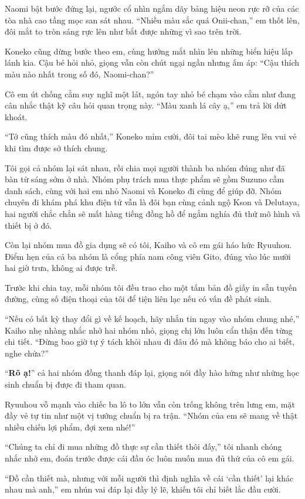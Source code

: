 ﻿\documentclass[../main.tex]{subfiles}
\begin{document}
Naomi bật bước đứng lại, ngước cổ nhìn ngắm dãy bảng hiệu neon rực rỡ của các tòa nhà cao tầng mọc san sát nhau. ``Nhiều màu sắc quá Onii-chan,'' em thốt lên, đôi mắt to tròn sáng rực lên như bắt được những vì sao trên trời.

Koneko cũng dừng bước theo em, cùng hướng mắt nhìn lên những biển hiệu lấp lánh kia. Cậu bé hỏi nhỏ, giọng vẫn còn chút ngại ngần nhưng ấm áp: ``Cậu thích màu nào nhất trong số đó, Naomi-chan?''

Cô em út chống cằm suy nghĩ một lát, ngón tay nhỏ bé chạm vào cằm như đang cân nhắc thật kỹ câu hỏi quan trọng này. ``Màu xanh lá cây ạ,'' em trả lời dứt khoát.

``Tớ cũng thích màu đó nhất,'' Koneko mỉm cười, đôi tai mèo khẽ rung lên vui vẻ khi tìm được sở thích chung.

Tôi gọi cả nhóm lại sát nhau, rồi chia mọi người thành ba nhóm đúng như đã bàn từ sáng sớm ở nhà. Nhóm phụ trách mua thực phẩm sẽ gồm Suzuno cầm danh sách, cùng với hai em nhỏ Naomi và Koneko đi cùng để giúp đỡ. Nhóm chuyên đi khám phá khu điện tử vẫn là đôi bạn cùng cảnh ngộ Kson và Delutaya, hai người chắc chắn sẽ mất hàng tiếng đồng hồ để ngắm nghía đủ thứ mô hình và thiết bị ở đó.

Còn lại nhóm mua đồ gia dụng sẽ có tôi, Kaiho và cô em gái háo hức Ryuuhou. Điểm hẹn của cả ba nhóm là cổng phía nam công viên Gito, đúng vào lúc mười hai giờ trưa, không ai được trễ.

Trước khi chia tay, mỗi nhóm tôi đều trao cho một tấm bản đồ giấy in sẵn tuyến đường, cùng số điện thoại của tôi để tiện liên lạc nếu có vấn đề phát sinh.

``Nếu có bất kỳ thay đổi gì về kế hoạch, hãy nhắn tin ngay vào nhóm chung nhé,'' Kaiho nhẹ nhàng nhắc nhở hai nhóm nhỏ, giọng chị lớn luôn cẩn thận đến từng chi tiết. ``Đừng bao giờ tự ý tách khỏi nhau đi đâu đó mà không báo cho ai biết, nghe chửa?''

``\textbf{Rõ ạ!}'' cả hai nhóm đồng thanh đáp lại, giọng nói đầy hào hứng như những học sinh chuẩn bị được đi tham quan.

Ryuuhou vỗ mạnh vào chiếc ba lô to lớn vẫn còn trống không trên lưng em, mặt đầy vẻ tự tin như một vị tướng chuẩn bị ra trận. ``Nhóm của em sẽ mang về thật nhiều chiến lợi phẩm, đợi xem nhé!''

``Chúng ta chỉ đi mua những đồ thực sự cần thiết thôi đấy,'' tôi nhanh chóng nhắc nhở em, đoán trước được cái đầu óc luôn muốn mua đủ thứ của cô em gái.

``Đồ cần thiết mà, nhưng với mỗi người thì định nghĩa về cái `cần thiết' lại khác nhau mà anh,'' em nhún vai đáp lại đầy lý lẽ, khiến tôi chỉ biết lắc đầu cười.
\end{document}
